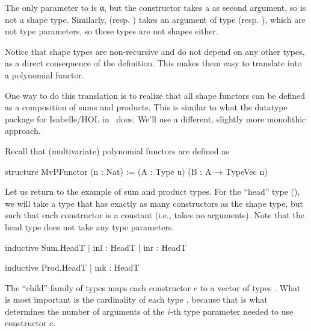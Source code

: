 The only parameter to  is α, but the  constructor takes a  as second argument,
so  is not a shape type.
Similarly,  (resp. ) takes an argument of type  (resp. ),
which are not type parameters, so these types are not shapes either.

Notice that shape types are non-recursive and do not depend on any other types, as a direct consequence 
of the definition. This makes them easy to translate into a polynomial functor. 

\begin{remark}
    One way to do this translation is to realize that all shape functors can be defined as a
    composition of sums and products. 
    This is similar to what the datatype package for Isabelle/HOL in~\cite{traytelCategoryTheoryBased} does.
    We'll use a different, slightly more monolithic approach.
\end{remark}

Recall that (multivariate) polynomial functors are defined as
\begin{leancode}
    structure MvPFunctor (n : Nat) :=
      (A : Type u) (B : A → TypeVec n)
\end{leancode}


Let us return to the example of sum and product types. 
For the ``head'' type (), we will take a type that has exactly as many constructors as
the shape type, but such that each constructor is a constant (i.e., takes no arguments).
Note that the head type does not take any type parameters. 

\begin{center}
    \begin{minipage}[t]{0.45\linewidth}
        \begin{leancode}
    inductive Sum.HeadT
      | inl : HeadT
      | inr : HeadT
        \end{leancode}
    \end{minipage}
    \begin{minipage}[t]{0.45\linewidth}
        \begin{leancode}    
    inductive Prod.HeadT
      | mk : HeadT
        \end{leancode}
    \end{minipage}
\end{center}

The ``child'' family of types maps each constructor $c$ to a vector of types .
What is most important is the cardinality of each type , 
because that is what determines the number of arguments of the $i$-th type parameter needed
to use constructor $c$. 

